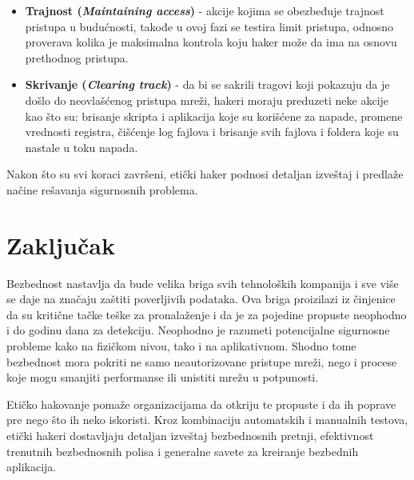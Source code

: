 \documentclass[a4paper]{article}
\begin{document}
{\begin{itemize}
\item \textbf{Trajnost ({\em Maintaining access})} - akcije kojima se obezbeđuje trajnost pristupa u budućnosti, takođe u ovoj fazi se testira limit pristupa, odnosno proverava kolika je maksimalna kontrola koju haker može da ima na osnovu prethodnog pristupa. 
\item \textbf{Skrivanje ({\em Clearing track})} - da bi se sakrili tragovi koji pokazuju da je došlo do neovlašćenog pristupa mreži, hakeri moraju preduzeti neke akcije kao što su: brisanje skripta i aplikacija koje su korišćene za napade, promene vrednosti registra, čišćenje log fajlova i brisanje svih fajlova i foldera koje su nastale u toku napada.
\end{itemize}

Nakon što su svi koraci završeni, etički haker podnosi detaljan izveštaj i predlaže načine rešavanja sigurnosnih problema.
\cite{stepsethack}
\newpage

\section{Zaključak}
\label{sec:zakljucak}

Bezbednost nastavlja da bude velika briga svih tehnoloških kompanija i sve više se daje na značaju zaštiti poverljivih podataka. Ova briga proizilazi iz činjenice da su kritične tačke teške za pronalaženje i da je za pojedine propuste neophodno i do godinu dana za detekciju. Neophodno je razumeti potencijalne sigurnosne probleme kako na fizičkom nivou, tako i na aplikativnom. Shodno tome bezbednost mora pokriti ne samo neautorizovane pristupe mreži, nego i procese koje mogu smanjiti performanse ili unistiti mrežu u potpunosti.

Etičko hakovanje pomaže organizacijama da otkriju te propuste i da ih poprave pre nego što ih neko iskoristi. Kroz kombinaciju automatskih i manualnih testova, etički hakeri dostavljaju detaljan izveštaj bezbednosnih pretnji, efektivnost trenutnih bezbednosnih polisa i generalne savete za kreiranje bezbednih aplikacija.

\newpage

\appendix

\begin{thebibliography}{11}


\end{thebibliography}}
\end{document}
